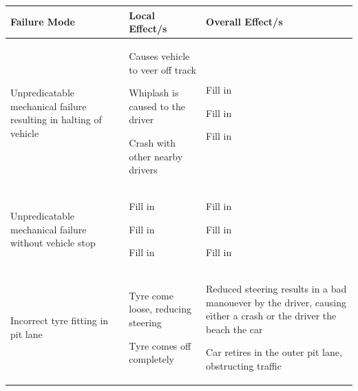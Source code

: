 \documentclass[12pt]{article} %
\begin{document}
\begin{center}
	\begin{longtable}{p{4cm} | p{6cm}| p{6cm}}
		Failure Mode & Local Effect/s & Overall Effect/s \\
		\hline \hline
		Unpredicatable mechanical failure resulting in halting of vehicle & 
			\begin{description} \item{Causes vehicle to veer off track} \item{Whiplash is caused to the driver} \item{Crash with other nearby drivers}
			\end{description} & 
			\begin{description} \item{Fill in} \item{Fill in} \item{Fill in}
			\end{description}\\ \hline


		Unpredicatable mechanical failure without vehicle stop &
			\begin{description} \item{Fill in} \item{Fill in} \item{Fill in}
			\end{description} & 
			\begin{description} \item{Fill in} \item{Fill in} \item{Fill in}
			\end{description}\\ \hline

		Incorrect tyre fitting in pit lane &
			\begin{description} \item{Tyre come loose, reducing steering} \item{Tyre comes off completely}
			\end{description} & 
			\begin{description} \item{Reduced steering results in a bad manouever by the driver, causing either a crash or the driver the beach the car} \item{Car retires in the outer pit lane, obstructing traffic}
			\end{description}\\ \hline



\end{longtable}
\end{center}
\end{document}
